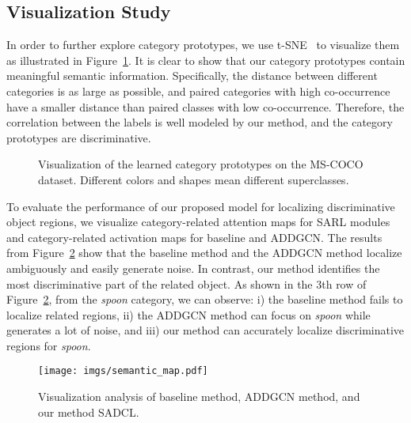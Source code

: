 \documentclass{ecai}
\begin{document}
\subsection{Visualization Study}
In order to further explore category prototypes, we use t-SNE~\cite{tsne2008visualizing} to visualize them as illustrated in Figure~\ref{label_prototype}.
It is clear to show that our category prototypes contain meaningful semantic information.
Specifically, the distance between different categories is as large as possible, and paired categories with high co-occurrence have a smaller distance than paired classes with low co-occurrence.
Therefore, the correlation between the labels is well modeled by our method, and the category prototypes are discriminative.
\begin{figure}[b]
\centering
	\subfigbottomskip=-5pt
	
	\caption{Visualization of the learned category prototypes on the MS-COCO dataset. Different colors and shapes mean different superclasses.}
	\label{label_prototype}
\end{figure}


To evaluate the performance of our proposed model for localizing discriminative object regions, we visualize category-related attention maps for SARL modules and category-related activation maps for baseline and ADDGCN.
The results from Figure~\ref{semantic_map} show that the baseline method and the ADDGCN method localize ambiguously and easily generate noise. In contrast, our method identifies the most discriminative part of the related object.	
As shown in the 3th row of Figure~\ref{semantic_map}, from the \textit{spoon} category, we can observe: i) the baseline method fails to localize related regions, ii) the ADDGCN method can focus on \textit{spoon} while generates a lot of noise, and iii) our method can accurately localize discriminative regions for \textit{spoon}.
\begin{figure}[t]
	\centering
	\texttt{[image: imgs/semantic\_map.pdf]}
\caption{Visualization analysis of baseline method, ADDGCN method, and our method SADCL.}
	\label{semantic_map}
\end{figure}
\end{document}
